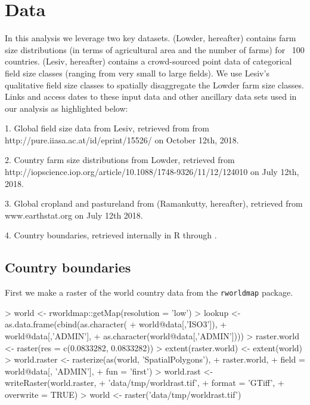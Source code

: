 \documentclass{article}
\begin{document}
\section{Data}

In this analysis we leverage two key datasets. \cite{Lowder} (Lowder, hereafter) contains farm size distributions (in terms of agricultural area and the number of farms) for ~100 countries. \cite{Lesiv} (Lesiv, hereafter) contains a crowd-sourced point data of categorical field size classes (ranging from very small to large fields). We use Lesiv's qualitative field size classes to spatially disaggregate the Lowder farm size classes. Links and access dates to these input data and other ancillary data sets used in our analysis as highlighted below:

1. Global field size data from Lesiv, retrieved from from http://pure.iiasa.ac.at/id/eprint/15526/ on October 12th, 2018.

2. Country farm size distributions from Lowder, retrieved from 
http://iopscience.iop.org/article/10.1088/1748-9326/11/12/124010 on July 12th, 2018.

3. Global cropland and pastureland from \cite{Ramankutty} (Ramankutty, hereafter), retrieved from www.earthstat.org on July 12th 2018.

4. Country boundaries, retrieved internally in R through \cite{R-rworldmap}.


\subsection{Country boundaries}

First we make a raster of the world country data from the \texttt{rworldmap} package.
\begin{Schunk}
\begin{Sinput}
> world  <- rworldmap::getMap(resolution = 'low')
> lookup <- as.data.frame(cbind(as.character(
+   world@data[,'ISO3']),
+   world@data[,'ADMIN'],
+   as.character(world@data[,'ADMIN'])))
> raster.world <- raster(res = c(0.0833282, 0.0833282))
> extent(raster.world) <- extent(world)
> world.raster <- rasterize(as(world, 'SpatialPolygons'), 
+                           raster.world,
+                           field = world@data[, 'ADMIN'],
+                           fun   = 'first')
> world.rast <- writeRaster(world.raster, 
+                           'data/tmp/worldrast.tif', 
+                           format    = 'GTiff', 
+                           overwrite = TRUE)
> world  <- raster('data/tmp/worldrast.tif')
\end{Sinput}
\end{Schunk}
\end{document}
